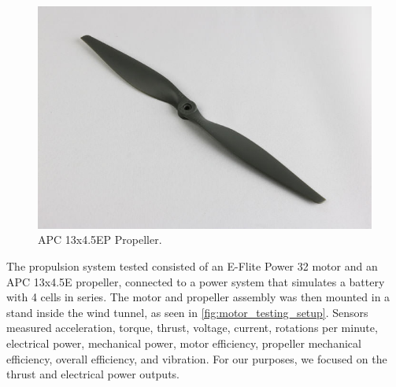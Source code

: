 \begin{figure}[htpb]
    \centering
    \includegraphics[width=0.88\linewidth]{figures/propulsion_data/apc13x4_5ep.jpg}
    \caption{APC 13x4.5EP Propeller.}
    \label{fig:apc13x4_5ep}
\end{figure}


\newpage

The propulsion system tested consisted of an E-Flite Power 32 motor and an APC 13x4.5E propeller, connected to a power system that simulates a battery with 4 cells in series. The motor and propeller assembly was then mounted in a stand inside the wind tunnel, as seen in \autoref{fig:motor_testing_setup}. Sensors measured acceleration, torque, thrust, voltage, current, rotations per minute, electrical power, mechanical power, motor efficiency, propeller mechanical efficiency, overall efficiency, and vibration. For our purposes, we focused on the thrust and electrical power outputs.

